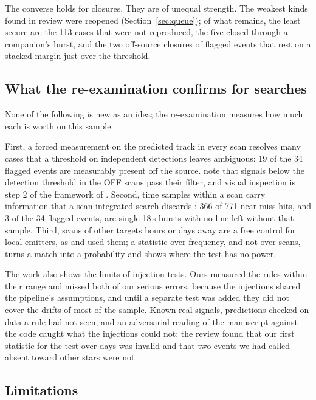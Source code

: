 \documentclass[twocolumn]{aastex631}
\begin{document}
The converse holds for closures. They are of unequal strength. The weakest
kinds found in review were reopened (Section~\ref{sec:queue}); of what
remains, the least secure are the 113 cases that were not reproduced, the
five closed through a companion's burst, and the two off-source closures of
flagged events that rest on a stacked margin just over the threshold.

\subsection{What the re-examination confirms for searches}

None of the following is new as an idea; the re-examination measures how
much each is worth on this sample.

First, a forced measurement on the predicted track in every scan resolves
many cases that a threshold on independent detections leaves ambiguous: 19
of the 34 flagged events are measurably present off the source.
\citet{Price2020} note that signals below the detection threshold in the
OFF scans pass their filter, and visual inspection is step 2 of the
framework of \citet{Sheikh2021}. Second, time samples within a scan carry
information that a scan-integrated search discards
\citep[see also][]{Brzycki2023}: 366 of 771 near-miss hits, and 3 of the 34
flagged events, are single 18\,s bursts with no line left without that
sample. Third, scans of
other targets hours or days away are a free control for local emitters, as
\citet{Price2020} and \citet{Painter2025} used them; a statistic over
frequency, and not over scans, turns a match into a probability and shows
where the test has no power.

The work also shows the limits of injection tests. Ours measured the rules
within their range and missed both of our serious errors, because the
injections shared the pipeline's assumptions, and until a separate test was
added they did not cover the drifts of most of the sample. Known real signals, predictions checked on
data a rule had not seen, and an adversarial reading of the manuscript
against the code caught what the injections could not: the review found
that our first statistic for the test over days was invalid and that two
events we had called absent toward other stars were not.

\subsection{Limitations}
\end{document}
